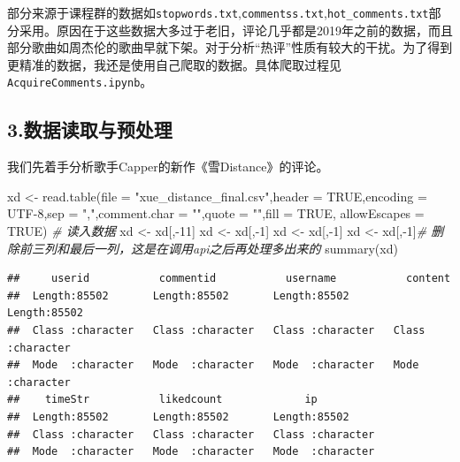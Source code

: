 \documentclass[
]{article}
\newenvironment{Shaded}{\begin{snugshade}}{\end{snugshade}}
\newcommand{\AttributeTok}[1]{\textcolor[rgb]{0.77,0.63,0.00}{#1}}
\newcommand{\CommentTok}[1]{\textcolor[rgb]{0.56,0.35,0.01}{\textit{#1}}}
\newcommand{\ConstantTok}[1]{\textcolor[rgb]{0.00,0.00,0.00}{#1}}
\newcommand{\DecValTok}[1]{\textcolor[rgb]{0.00,0.00,0.81}{#1}}
\newcommand{\FunctionTok}[1]{\textcolor[rgb]{0.00,0.00,0.00}{#1}}
\newcommand{\NormalTok}[1]{#1}
\newcommand{\OtherTok}[1]{\textcolor[rgb]{0.56,0.35,0.01}{#1}}
\newcommand{\SpecialCharTok}[1]{\textcolor[rgb]{0.00,0.00,0.00}{#1}}
\newcommand{\StringTok}[1]{\textcolor[rgb]{0.31,0.60,0.02}{#1}}
\begin{document}
部分来源于课程群的数据如\texttt{stopwords.txt},\texttt{commentss.txt},\texttt{hot\_comments.txt}部分采用。原因在于这些数据大多过于老旧，评论几乎都是2019年之前的数据，而且部分歌曲如周杰伦的歌曲早就下架。对于分析``热评''性质有较大的干扰。为了得到更精准的数据，我还是使用自己爬取的数据。具体爬取过程见\texttt{AcquireComments.ipynb}。

\hypertarget{ux6570ux636eux8bfbux53d6ux4e0eux9884ux5904ux7406}{%
\subsection{3.数据读取与预处理}\label{ux6570ux636eux8bfbux53d6ux4e0eux9884ux5904ux7406}}

我们先着手分析歌手Capper的新作《雪Distance》的评论。

\begin{Shaded}
\begin{Highlighting}[]
\NormalTok{xd }\OtherTok{\textless{}{-}} \FunctionTok{read.table}\NormalTok{(}\AttributeTok{file =} \StringTok{"xue\_distance\_final.csv"}\NormalTok{,}\AttributeTok{header =} \ConstantTok{TRUE}\NormalTok{,}\AttributeTok{encoding =} \StringTok{\textquotesingle{}UTF{-}8\textquotesingle{}}\NormalTok{,}\AttributeTok{sep =} \StringTok{","}\NormalTok{,}\AttributeTok{comment.char =} \StringTok{""}\NormalTok{,}\AttributeTok{quote =} \StringTok{""}\NormalTok{,}\AttributeTok{fill =} \ConstantTok{TRUE}\NormalTok{, }\AttributeTok{allowEscapes =} \ConstantTok{TRUE}\NormalTok{) }\CommentTok{\# 读入数据}
\NormalTok{xd }\OtherTok{\textless{}{-}}\NormalTok{ xd[,}\SpecialCharTok{{-}}\DecValTok{11}\NormalTok{]}
\NormalTok{xd }\OtherTok{\textless{}{-}}\NormalTok{ xd[,}\SpecialCharTok{{-}}\DecValTok{1}\NormalTok{]}
\NormalTok{xd }\OtherTok{\textless{}{-}}\NormalTok{ xd[,}\SpecialCharTok{{-}}\DecValTok{1}\NormalTok{]}
\NormalTok{xd }\OtherTok{\textless{}{-}}\NormalTok{ xd[,}\SpecialCharTok{{-}}\DecValTok{1}\NormalTok{]}\CommentTok{\# 删除前三列和最后一列，这是在调用api之后再处理多出来的}
\FunctionTok{summary}\NormalTok{(xd)}
\end{Highlighting}
\end{Shaded}

\begin{verbatim}
##     userid           commentid           username           content         
##  Length:85502       Length:85502       Length:85502       Length:85502      
##  Class :character   Class :character   Class :character   Class :character  
##  Mode  :character   Mode  :character   Mode  :character   Mode  :character  
##    timeStr           likedcount             ip           
##  Length:85502       Length:85502       Length:85502      
##  Class :character   Class :character   Class :character  
##  Mode  :character   Mode  :character   Mode  :character
\end{verbatim}
\end{document}
